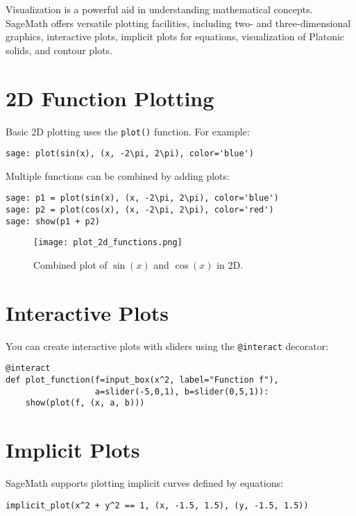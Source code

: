\documentclass[12pt]{book}
\begin{document}
Visualization is a powerful aid in understanding mathematical concepts. SageMath offers versatile plotting facilities, including two- and three-dimensional graphics, interactive plots, implicit plots for equations, visualization of Platonic solids, and contour plots.

\section{2D Function Plotting}

Basic 2D plotting uses the \texttt{plot()} function. For example:

\begin{verbatim}
sage: plot(sin(x), (x, -2\pi, 2\pi), color='blue')
\end{verbatim}

Multiple functions can be combined by adding plots:

\begin{verbatim}
sage: p1 = plot(sin(x), (x, -2\pi, 2\pi), color='blue')
sage: p2 = plot(cos(x), (x, -2\pi, 2\pi), color='red')
sage: show(p1 + p2)
\end{verbatim}

\begin{figure}[H]
  \centering
  \texttt{[image: plot\_2d\_functions.png]}
  \caption{Combined plot of \( \sin(x) \) and \( \cos(x) \) in 2D.}
  \label{fig:plot_2d_functions}
\end{figure}

\section{Interactive Plots}

You can create interactive plots with sliders using the \texttt{@interact} decorator:

\begin{verbatim}
@interact
def plot_function(f=input_box(x^2, label="Function f"), 
                  a=slider(-5,0,1), b=slider(0,5,1)):
    show(plot(f, (x, a, b)))
\end{verbatim}

\section{Implicit Plots}

SageMath supports plotting implicit curves defined by equations:

\begin{verbatim}
implicit_plot(x^2 + y^2 == 1, (x, -1.5, 1.5), (y, -1.5, 1.5))
\end{verbatim}
\end{document}
